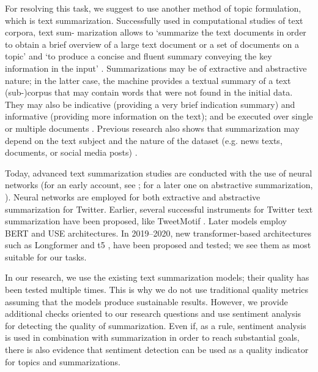 For resolving this task, we suggest to use another method of topic formulation, which is text summarization. Successfully used in computational studies of text corpora, text sum- marization allows to ‘summarize the text documents in order to obtain a brief overview of a large text document or a set of documents on a topic’ \cite[p.~4]{AggarwalZhai} and ‘to produce a concise and fluent summary conveying the key information in the input’ \cite[p.~44]{NenkovaMcKeown}. Summarizations may be of extractive and abstractive nature; in the latter case, the machine provides a textual summary of a text (sub-)corpus that may contain words that were not found in the initial data. They may also be indicative (providing a very brief indication summary) and informative (providing more information on the text); and be executed over single or multiple documents  \cite{NenkovaMcKeown}. Previous research also shows that summarization may depend on the text subject and the nature of the dataset (e.g. news texts, documents, or social media posts) \cite{TasKiyani}.

Today, advanced text summarization studies are conducted with the use of neural networks (for an early account, see \cite{FerreiraFreitasDeSouza}; for a later one on abstractive summarization, \cite{Kaikhah}). Neural networks are employed for both extractive \cite{NallapatiZhouGulcehreXiang} and abstractive summarization \cite{CelisKeswani} for Twitter. Earlier, several successful instruments for Twitter text summarization have been proposed, like TweetMotif \cite{LiZhang}. Later models employ BERT \cite{CelisKeswani} and USE \cite{MottaghiniaFeiziDerakhshiFarzinvash} architectures. In 2019--2020, new transformer-based architectures such as Longformer \cite{AsgariChenaghluNikzadKhasmakhiMinaee} and t5 \cite{BeltagyPetersCohan}, have been proposed and tested; we see them as most suitable for our tasks.

In our research, we use the existing text summarization models; their quality has been tested multiple times. This is why we do not use traditional quality metrics assuming that the models produce sustainable results. However, we provide additional checks oriented to our research questions and use sentiment analysis for detecting the quality of summarization. Even if, as a rule, sentiment analysis is used in combination with summarization in order to reach substantial goals, there is also evidence that sentiment detection can be used as a quality indicator for topics \cite{RaffelShazeerRoberts} and summarizations.

